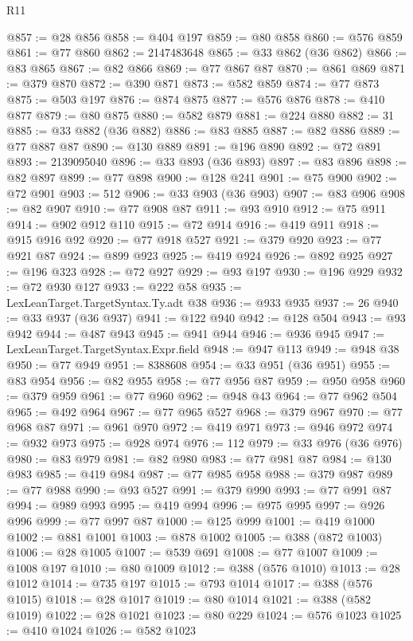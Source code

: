 \begin{lexlean}{R11}
\begin{coremodule}
@857 := @28 @856
@858 := @404 @197
@859 := @80 @858
@860 := @576 @859
@861 := @77 @860
@862 := 2147483648
@865 := @33 @862 (@36 @862)
@866 := @83 @865
@867 := @82 @866
@869 := @77 @867 @87
@870 := @861 @869
@871 := @379 @870
@872 := @390 @871
@873 := @582 @859
@874 := @77 @873
@875 := @503 @197
@876 := @874 @875
@877 := @576 @876
@878 := @410 @877
@879 := @80 @875
@880 := @582 @879
@881 := @224 @880
@882 := 31
@885 := @33 @882 (@36 @882)
@886 := @83 @885
@887 := @82 @886
@889 := @77 @887 @87
@890 := @130 @889
@891 := @196 @890
@892 := @72 @891
@893 := 2139095040
@896 := @33 @893 (@36 @893)
@897 := @83 @896
@898 := @82 @897
@899 := @77 @898
@900 := @128 @241
@901 := @75 @900
@902 := @72 @901
@903 := 512
@906 := @33 @903 (@36 @903)
@907 := @83 @906
@908 := @82 @907
@910 := @77 @908 @87
@911 := @93 @910
@912 := @75 @911
@914 := @902 @912 @110
@915 := @72 @914
@916 := @419 @911
@918 := @915 @916 @92
@920 := @77 @918 @527
@921 := @379 @920
@923 := @77 @921 @87
@924 := @899 @923
@925 := @419 @924
@926 := @892 @925
@927 := @196 @323
@928 := @72 @927
@929 := @93 @197
@930 := @196 @929
@932 := @72 @930 @127
@933 := @222 @58
@935 := LexLeanTarget.TargetSyntax.Ty.adt @38
@936 := @933 @935
@937 := 26
@940 := @33 @937 (@36 @937)
@941 := @122 @940
@942 := @128 @504
@943 := @93 @942
@944 := @487 @943
@945 := @941 @944
@946 := @936 @945
@947 := LexLeanTarget.TargetSyntax.Expr.field
@948 := @947 @113
@949 := @948 @38
@950 := @77 @949
@951 := 8388608
@954 := @33 @951 (@36 @951)
@955 := @83 @954
@956 := @82 @955
@958 := @77 @956 @87
@959 := @950 @958
@960 := @379 @959
@961 := @77 @960
@962 := @948 @43
@964 := @77 @962 @504
@965 := @492 @964
@967 := @77 @965 @527
@968 := @379 @967
@970 := @77 @968 @87
@971 := @961 @970
@972 := @419 @971
@973 := @946 @972
@974 := @932 @973
@975 := @928 @974
@976 := 112
@979 := @33 @976 (@36 @976)
@980 := @83 @979
@981 := @82 @980
@983 := @77 @981 @87
@984 := @130 @983
@985 := @419 @984
@987 := @77 @985 @958
@988 := @379 @987
@989 := @77 @988
@990 := @93 @527
@991 := @379 @990
@993 := @77 @991 @87
@994 := @989 @993
@995 := @419 @994
@996 := @975 @995
@997 := @926 @996
@999 := @77 @997 @87
@1000 := @125 @999
@1001 := @419 @1000
@1002 := @881 @1001
@1003 := @878 @1002
@1005 := @388 (@872 @1003)
@1006 := @28 @1005
@1007 := @539 @691
@1008 := @77 @1007
@1009 := @1008 @197
@1010 := @80 @1009
@1012 := @388 (@576 @1010)
@1013 := @28 @1012
@1014 := @735 @197
@1015 := @793 @1014
@1017 := @388 (@576 @1015)
@1018 := @28 @1017
@1019 := @80 @1014
@1021 := @388 (@582 @1019)
@1022 := @28 @1021
@1023 := @80 @229
@1024 := @576 @1023
@1025 := @410 @1024
@1026 := @582 @1023

\end{coremodule}
\end{lexlean}

